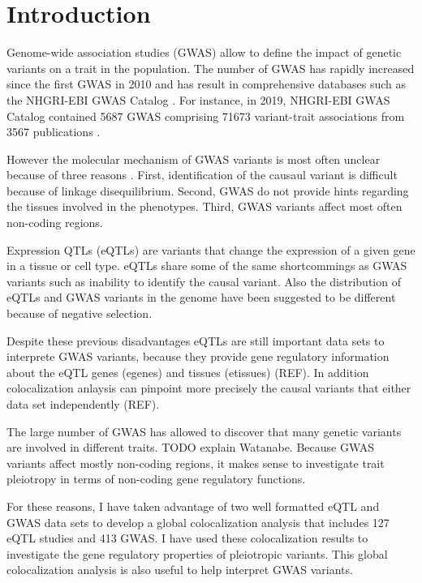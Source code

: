 \section*{Introduction}\label{sec:introduction}

Genome-wide association studies (GWAS) allow to define the impact of genetic variants on a trait in the population.
%
The number of GWAS has rapidly increased since the first GWAS in 2010 and has result in comprehensive databases such as the NHGRI-EBI GWAS Catalog \citep{2018.Parkinson.Buniello}.
%
For instance, in 2019, NHGRI-EBI GWAS Catalog contained 5687 GWAS comprising 71673 variant-trait associations from 3567 publications \citep{2018.Parkinson.Buniello}.

However the molecular mechanism of GWAS variants is most often unclear because of three reasons \citep{2020.Trynka.CanoGamez}.
%
First, identification of the causaul variant is difficult because of linkage disequilibrium.
%
Second, GWAS do not provide hints regarding the tissues involved in the phenotypes.
%
Third, GWAS variants affect most often non-coding regions.

Expression QTLs (eQTLs) are variants that change the expression of a given gene in a tissue or cell type.
%
eQTLs share some of the same shortcommings as GWAS variants such as inability to identify the causal variant.
%
Also the distribution of eQTLs and GWAS variants in the genome have been suggested to be different because of negative selection.

Despite these previous disadvantages eQTLs are still important data sets to interprete GWAS variants, because they provide gene regulatory information about the eQTL genes (egenes) and tissues (etissues) (REF).
%
In addition colocalization anlaysis can pinpoint more precisely the causal variants that either data set independently (REF).

The large number of GWAS has allowed to discover that many genetic variants are involved in different traits.
%
TODO explain Watanabe.
%
Because GWAS variants affect mostly non-coding regions, it makes sense to investigate trait pleiotropy in terms of non-coding gene regulatory functions.

For these reasons, I have taken advantage of two well formatted eQTL and GWAS data sets to develop a global colocalization analysis that includes 127 eQTL studies and 413 GWAS.
%
I have used these colocalization results to investigate the gene regulatory properties of pleiotropic variants.
%
This global colocalization analysis is also useful to help interpret GWAS variants.
